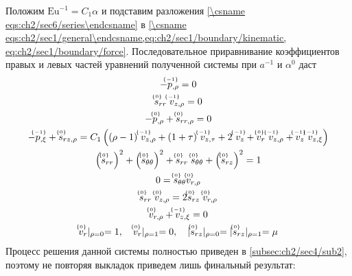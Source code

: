 Положим $\text{Eu}^{-1} = C_1 \alpha$ и подставим разложения \cref{\csname eqs:ch2/sec6/series\endcsname} в \cref{\csname eqs:ch2/sec1/general\endcsname,eq:ch2/sec1/boundary/kinematic, eq:ch2/sec1/boundary/force}. Последовательное приравнивание коэффициентов правых и левых частей уравнений полученной системы при $a^{-1}$ и $\alpha^0$ даст
\begin{gather}
  \label{eqs:ch2/sec6/sub2/-1/motion:2}
  -\uindex{p}{-1}_{,\rho} = 0
  \\
  \label{eqs:ch2/sec6/sub2/-1/coax:2}
  \uindex{s}{0}_{rr} \; \uindex{v}{-1}_{z,\rho} = 0
  \\
  \label{eqs:ch2/sec6/sub2/0/motion:1}
  -\uindex{p}{0}_{,\rho}+\uindex{s}{0}_{rr,\rho} = 0
  \\
  \label{eqs:ch2/sec6/sub2/0/motion:2}
  -\uindex{p}{-1}_{,\xi} + \uindex{s}{0}_{rz,\rho} = C_1 \left((\rho-1) \ \uindex{v}{-1}_{z,\rho} + (1+\tau) \ \uindex{v}{-1}_{z,\tau} + 2 \ \uindex{v}{-1}_{z} + \uindex{v}{0}_{r} \ \uindex{v}{-1}_{z,\rho} + \uindex{v}{-1}_{z} \ \uindex{v}{-1}_{z,\xi} \right)
  \\
  \label{eqs:ch2/sec6/sub2/0/plasticity}
  \left(\uindex{s}{0}_{rr}\right)^2 + \left(\uindex{s}{0}_{\theta\theta}\right)^2 + \uindex{s}{0}_{rr}\; \uindex{s}{0}_{\theta\theta} + \left(\uindex{s}{0}_{rz}\right)^2 = 1
  \\
  \label{eqs:ch2/sec6/sub2/0/coax:1}
  0 = \uindex{s}{0}_{\theta\theta} \uindex{v}{0}_{r,\rho}
  \\
  \label{eqs:ch2/sec6/sub2/0/coax:2}
  \uindex{s}{0}_{rr} \; \uindex{v}{0}_{z,\rho} = 2 \uindex{s}{0}_{rz} \; \uindex{v}{0}_{r,\rho}
  \\
  \label{eqs:ch2/sec6/sub2/0/uncompress}
  \uindex{v}{0}_{r,\rho} + \uindex{v}{-1}_{z,\xi} = 0
  \\
  \label{eq:ch2/sec6/sub2/boundary/0}
  \uindex{v}{0}_{r}\lvert_{\rho=0} = 1,\quad \uindex{v}{0}_{r}\lvert_{\rho=1} = 0, \quad \lvert \uindex{s}{0}_{rz}\lvert_{\rho=0} = \lvert \uindex{s}{0}_{rz}\lvert_{\rho=1} = \mu
\end{gather}
Процесс решения данной системы полностью приведен в \cref{subsec:ch2/sec4/sub2}, поэтому не повторяя выкладок приведем лишь финальный результат:
\begingroup
\allowdisplaybreaks
